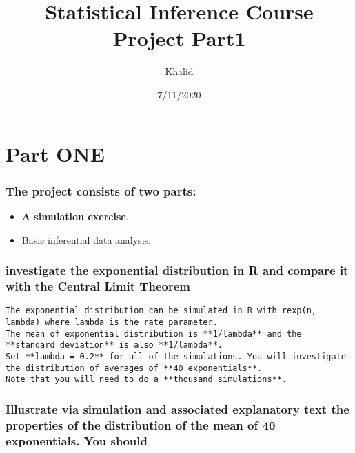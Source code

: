 \documentclass[
]{article}
\title{Statistical Inference Course Project Part1}
\author{Khalid}
\date{7/11/2020}
\providecommand{\tightlist}{%
  \setlength{\itemsep}{0pt}\setlength{\parskip}{0pt}}
\begin{document}
\maketitle

\hypertarget{part-one}{%
\section{\texorpdfstring{\textbf{Part ONE}}{Part ONE}}\label{part-one}}

\hypertarget{the-project-consists-of-two-parts}{%
\subsubsection{The project consists of two
parts:}\label{the-project-consists-of-two-parts}}

\begin{itemize}
\tightlist
\item
  \textbf{A simulation exercise}.
\item
  Basic inferential data analysis.
\end{itemize}

\hypertarget{investigate-the-exponential-distribution-in-r-and-compare-it-with-the-central-limit-theorem}{%
\subsubsection{investigate the exponential distribution in R and compare
it with the Central Limit
Theorem}\label{investigate-the-exponential-distribution-in-r-and-compare-it-with-the-central-limit-theorem}}

\begin{verbatim}
The exponential distribution can be simulated in R with rexp(n, lambda) where lambda is the rate parameter. 
The mean of exponential distribution is **1/lambda** and the **standard deviation** is also **1/lambda**. 
Set **lambda = 0.2** for all of the simulations. You will investigate the distribution of averages of **40 exponentials**. 
Note that you will need to do a **thousand simulations**.
\end{verbatim}

\hypertarget{illustrate-via-simulation-and-associated-explanatory-text-the-properties-of-the-distribution-of-the-mean-of-40-exponentials.-you-should}{%
\subsubsection{Illustrate via simulation and associated explanatory text
the properties of the distribution of the mean of 40 exponentials. You
should}\label{illustrate-via-simulation-and-associated-explanatory-text-the-properties-of-the-distribution-of-the-mean-of-40-exponentials.-you-should}}
\end{document}
